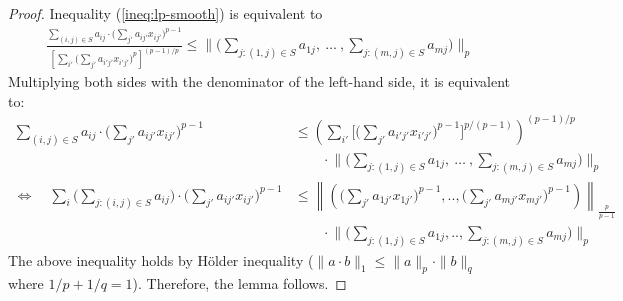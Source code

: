 \begin{proof}
Inequality (\ref{ineq:lp-smooth}) is equivalent to
\begin{align*}
\frac{ \sum_{(i,j) \in S} a_{ij} \cdot \bigl( \sum_{j'} a_{ij'} x_{ij'} \bigr)^{p-1} }{ \left[ \sum_{i'} \bigl( \sum_{j'} a_{i'j'} x_{i'j'} \bigr)^{p} \right]^{(p-1)/p}}  
	\leq   \biggl \| \biggl( \sum_{j: (1,j) \in S} a_{1j},\ \ldots\ , \sum_{j: (m,j) \in S} a_{mj}  \biggr) \biggr \|_{p}
\end{align*}
%
Multiplying both sides with the denominator of the left-hand side, it is equivalent to:
%
\begin{align*}
    \sum_{(i,j) \in S} a_{ij} \cdot \bigl( \sum_{j'} a_{ij'} x_{ij'} \bigr)^{p-1} &\leq
        \left ( \sum_{i'} \biggl [ \biggl( \sum_{j'} a_{i'j'} x_{i'j'} \biggr)^{p-1} \biggr ]^{p/(p-1)} \right )^{(p-1)/p} \\
        			& \qquad \cdot \biggl \| \biggl( \sum_{j: (1,j) \in S} a_{1j}, \ \ldots\ , \sum_{j: (m,j) \in S} a_{mj}  \biggr) \biggr \|_{p} \\
 \Leftrightarrow \quad  \sum_{i} \biggl( \sum_{j: (i,j) \in S} a_{ij} \biggr) \cdot \biggl( \sum_{j'} a_{ij'} x_{ij'} \biggr)^{p-1} &\leq
        \left \| \left( \biggl( \sum_{j'} a_{1j'} x_{1j'} \biggr)^{p-1},.., \biggl( \sum_{j'} a_{mj'} x_{mj'} \biggr)^{p-1} \right)   \right \|_{\frac{p}{p-1}} \\
        		& \qquad \cdot \biggl \| \biggl( \sum_{j: (1,j) \in S} a_{1j},.., \sum_{j: (m,j) \in S} a_{mj}  \biggr) \biggr \|_{p}
\end{align*}
The above inequality holds by H\"older inequality ($\| a \cdot b\|_{1} \leq \| a \|_{p} \cdot \| b \|_{q}$ where $1/p + 1/q = 1$).
Therefore, the lemma follows.
\end{proof}


